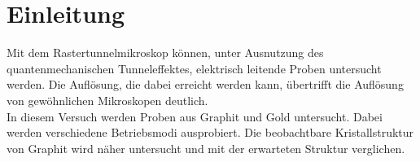 \section{Einleitung}
Mit dem Rastertunnelmikroskop können, unter Ausnutzung des quantenmechanischen Tunneleffektes, elektrisch leitende Proben untersucht werden. Die Auflösung, die dabei erreicht werden kann, übertrifft die Auflösung von gewöhnlichen Mikroskopen deutlich.\\
In diesem Versuch werden Proben aus Graphit und Gold untersucht. Dabei werden verschiedene Betriebsmodi ausprobiert. Die beobachtbare Kristallstruktur von Graphit wird näher untersucht und mit der erwarteten Struktur verglichen.  
